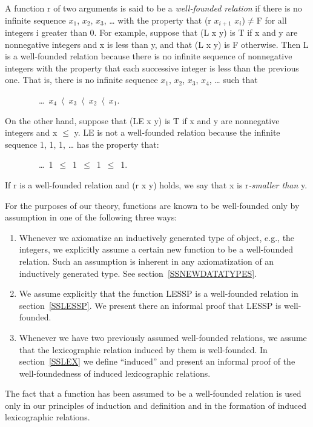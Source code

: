 \documentclass[10pt]{book}
\newenvironment{pubasis}{\begin{flushleft}}{\end{flushleft}}
\newenvironment{publist}{\begin{enumerate}}{\end{enumerate}}
\begin{document}
A function r of two arguments is said to be a \emph{well-founded relation} if
there is no infinite sequence
$x_{1}$, $x_{2}$, $x_{3}$, \ldots{} with the property that
(r $x_{i+1}$ $x_{i}$)$\neq$F for all integers i greater than 0.  
For example, suppose that (L x y) is T if x and y are
nonnegative integers and x is less than y, and that (L x y) is F
otherwise.  Then L is a well-founded relation
because there is no infinite sequence of nonnegative
integers with
the property that each successive integer is less than the previous one.
That is, there is no infinite sequence $x_{1}$, $x_{2}$, $x_{3}$, $x_{4}$, \ldots{} such that
\begin{pubasis}
~~~~~~~~\ldots{}~$x_{4}$~$\langle$~$x_{3}$~$\langle$~$x_{2}$~$\langle$~$x_{1}$.\\
\end{pubasis}
On the other hand, suppose that (LE x y) is T if
x and y are nonnegative integers and x $\leq$ y.  LE is not a well-founded relation
because the infinite sequence 1, 1, 1, \ldots{}
has the property that:
\begin{pubasis}
~~~~~~~~\ldots{}~1~$\leq$~1~$\leq$~1~$\leq$~1.\\
\end{pubasis}
If r is a well-founded  relation
and (r x y) holds, we  say that x is 
r\emph{-smaller than} y.

For the purposes of our theory, functions are known to be well-founded only
by assumption in one of the following three ways:
\begin{publist}
\item Whenever we axiomatize an inductively generated type of object, e.g., the integers,
we explicitly assume a certain new function to be a well-founded relation.
Such
an assumption is inherent in any axiomatization of an inductively generated
type.  See section~\ref{SSNEWDATATYPES}.
\item We assume explicitly that the function LESSP is a well-founded relation in section~\ref{SSLESSP}.
We present there an informal proof that LESSP is well-founded.
\item Whenever we have two previously assumed well-founded relations, we assume
that the lexicographic relation induced by them is well-founded.  In section~\ref{SSLEX}
we define ``induced'' and present an informal proof of the well-foundedness
of induced lexicographic relations.
\end{publist}

The fact that a function has been assumed to be a well-founded relation is used only
in our principles of induction and definition and in the formation of
induced lexicographic  relations.
\end{document}
